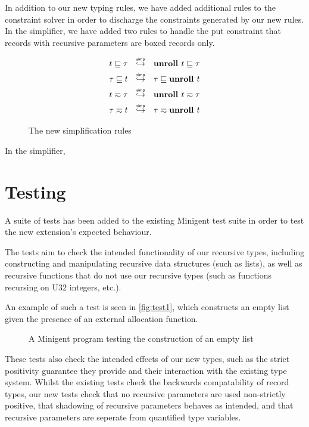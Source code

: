 In addition to our new typing rules, we have added additional rules to the constraint
solver in order to discharge the constraints generated by our new rules. In the simplifier,
we have added two rules to handle the \textsf{put} constraint that records with
recursive parameters are boxed records only.


\begin{figure}
    \centering
    \begin{align*}
       t \subtype \tau && \simp  && \textbf{unroll } t \subtype \tau \\
       \tau \subtype t && \simp  && \tau \subtype \textbf{unroll } t \\
       t \typeeq \tau  && \simp  && \textbf{unroll } t \typeeq \tau \\
       \tau \typeeq t  && \simp  && \tau \typeeq \textbf{unroll } t \\
    \end{align*}
    \caption{The new simplification rules}
    \label{fig:simprules}
\end{figure}

In the simplifier, 

\section{Testing}

A suite of tests has been added to the existing Minigent test suite in order to test the new extension's 
expected behaviour.

The tests aim to check the intended functionality of our recursive types, including constructing and manipulating
recursive data structures (such as lists), as well as recursive functions that do not use our recursive types 
(such as functions recursing on U32 integers, etc.).

An example of such a test is seen in \autoref{fig:test1}, which constructs an empty list given the presence
of an external allocation function.

\begin{figure}
    \centering
    
    \caption{A Minigent program testing the construction of an empty list}
    \label{fig:test1}
\end{figure}

These tests also check the intended effects of our new types, such as the strict positivity guarantee they provide
and their interaction with the existing type system. Whilst the existing tests check the backwards compatability of
record types, our new tests check that no recursive parameters are used non-strictly positive, that shadowing of recursive
parameters behaves as intended, and that recursive parameters are seperate from quantified type variables.

